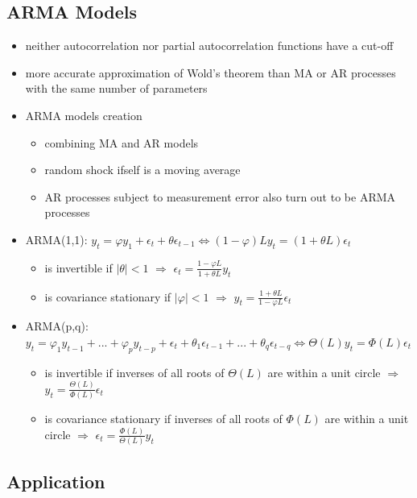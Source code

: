 \subsection{ARMA Models}

\begin{itemize}
\item neither autocorrelation nor partial autocorrelation functions have a cut-off
\item more accurate approximation of Wold's theorem than MA or AR processes with the same number of parameters
\item ARMA models creation
\begin{itemize}
\item combining MA and AR models
\item random shock ifself is a moving average
\item AR processes subject to measurement error also turn out to be ARMA processes
\end{itemize}
\item ARMA(1,1): $y_t = \varphi y_1 + \epsilon_t + \theta \epsilon_{t - 1} \Leftrightarrow (1 - \varphi)L y_t = (1 + \theta L)\epsilon_t$
\begin{itemize}
\item is invertible if $|\theta| < 1$ $\Rightarrow$ $\epsilon_t = \frac{1 - \varphi L}{1 + \theta L} y_t$
\item is covariance stationary if $|\varphi| < 1$ $\Rightarrow$ $y_t = \frac{1 + \theta L}{1 - \varphi L} \epsilon_t$
\end{itemize}
\item ARMA(p,q): $y_t = \varphi_1 y_{t-1} + ... + \varphi_p y_{t - p} + \epsilon_t + \theta_1 \epsilon_{t - 1} + ... + \theta_q \epsilon_{t - q} \Leftrightarrow \Theta(L)y_t = \Phi(L) \epsilon_t$
\begin{itemize}
\item is invertible if inverses of all roots of $\Theta(L)$ are within a unit circle $\Rightarrow$ $y_t = \frac{\Theta(L)}{\Phi(L)}\epsilon_t$
\item is covariance stationary if inverses of all roots of $\Phi(L)$ are within a unit circle $\Rightarrow$ $\epsilon_t = \frac{\Phi(L)}{\Theta(L)}y_t$
\end{itemize}
\end{itemize}

\subsection{Application}

